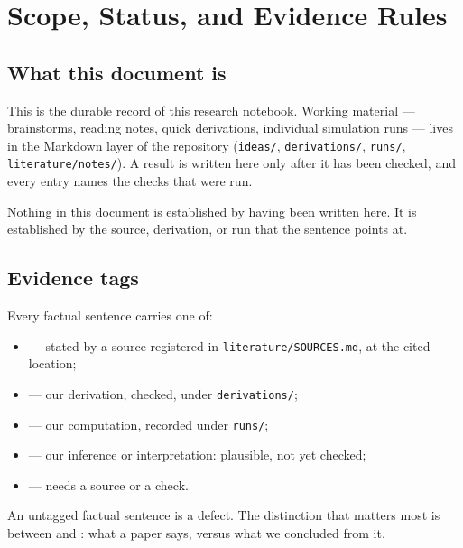 
\section{Scope, Status, and Evidence Rules}
\label{sec:frontmatter-status}

\subsection*{What this document is}

This is the durable record of this research notebook. Working material --- brainstorms, reading
notes, quick derivations, individual simulation runs --- lives in the Markdown layer of the
repository (\texttt{ideas/}, \texttt{derivations/}, \texttt{runs/}, \texttt{literature/notes/}). A
result is written here only after it has been checked, and every entry names the checks that were
run.

Nothing in this document is established by having been written here. It is established by the
source, derivation, or run that the sentence points at.

\subsection*{Evidence tags}

Every factual sentence carries one of:

\begin{itemize}
  \item \evS{}{} --- stated by a source registered in \texttt{literature/SOURCES.md}, at the cited
        location;
  \item {} --- our derivation, checked, under \texttt{derivations/};
  \item {} --- our computation, recorded under \texttt{runs/};
  \item \evI{} --- our inference or interpretation: plausible, not yet checked;
  \item \evQ{} --- needs a source or a check.
\end{itemize}

An untagged factual sentence is a defect. The distinction that matters most is between \evS{}{} and
\evI{}: what a paper says, versus what we concluded from it.

